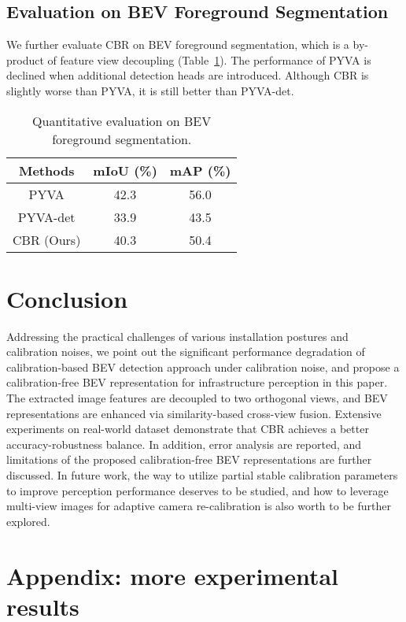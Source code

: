 \documentclass[letterpaper, 10 pt, conference]{ieeeconf}
\begin{document}
\subsection{Evaluation on BEV Foreground Segmentation}
We further evaluate CBR on BEV foreground segmentation, which is a by-product of feature view decoupling (Table~\ref{tab:seg}). The performance of PYVA \cite{pyva} is declined when additional detection heads are introduced. Although CBR is slightly worse than PYVA, it is still better than PYVA-det.

\begin{table}[ht]
\centering
\caption{Quantitative evaluation on BEV foreground segmentation.}
  \begin{tabular}{c|cc} 
  \hline
    \textbf{Methods} & \textbf{mIoU (\%)} & \textbf{mAP (\%)} \\ \hline
    PYVA \cite{pyva} & 42.3 & 56.0 \\
    PYVA-det & 33.9 & 43.5 \\ \hline
    CBR (Ours) & 40.3 & 50.4 \\ \hline
    
  \end{tabular}
  \label{tab:seg}
\end{table}

\section{Conclusion}
Addressing the practical challenges of various installation postures and calibration noises, we point out the significant performance degradation of calibration-based BEV detection approach under calibration noise, and propose a calibration-free BEV representation for infrastructure perception in this paper. The extracted image features are decoupled to two orthogonal views, and BEV representations are enhanced via similarity-based cross-view fusion. Extensive experiments on real-world dataset demonstrate that CBR achieves a better accuracy-robustness balance. In addition, error analysis are reported, and limitations of the proposed calibration-free BEV representations are further discussed. In future work, the way to utilize partial stable calibration parameters to improve perception performance deserves to be studied, and how to leverage multi-view images for adaptive camera re-calibration is also worth to be further explored.


\newpage
\section*{\textbf{Appendix: more experimental results}}
\end{document}
